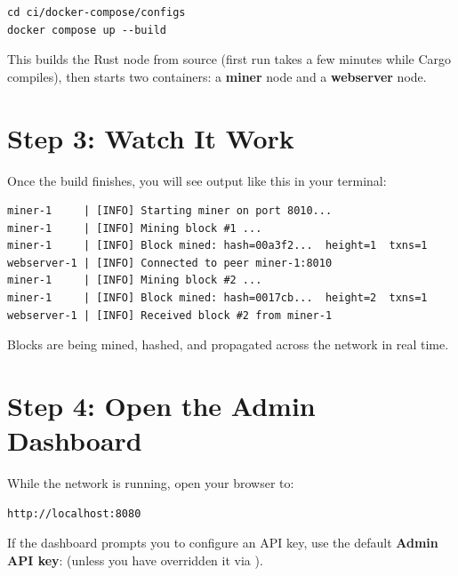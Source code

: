 \begin{verbatim}
cd ci/docker-compose/configs
docker compose up --build
\end{verbatim}

This builds the Rust node from source (first run takes a few minutes while Cargo compiles), then
starts two containers: a \textbf{miner} node and a \textbf{webserver} node.

\section{Step 3: Watch It Work}
\label{sec:step3-watch}

Once the build finishes, you will see output like this in your terminal:

\begin{verbatim}
miner-1     | [INFO] Starting miner on port 8010...
miner-1     | [INFO] Mining block #1 ...
miner-1     | [INFO] Block mined: hash=00a3f2...  height=1  txns=1
webserver-1 | [INFO] Connected to peer miner-1:8010
miner-1     | [INFO] Mining block #2 ...
miner-1     | [INFO] Block mined: hash=0017cb...  height=2  txns=1
webserver-1 | [INFO] Received block #2 from miner-1
\end{verbatim}

Blocks are being mined, hashed, and propagated across the network in real time.

\section{Step 4: Open the Admin Dashboard}
\label{sec:step4-dashboard}

While the network is running, open your browser to:

\begin{verbatim}
http://localhost:8080
\end{verbatim}

If the dashboard prompts you to configure an API key, use the default
\textbf{Admin API key}:  (unless you have overridden it via
).


